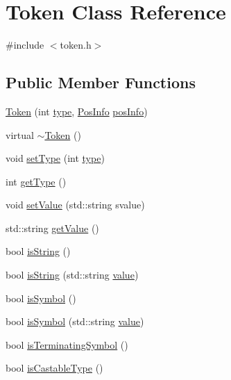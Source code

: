 \hypertarget{classToken}{}\section{Token Class Reference}
\label{classToken}


{\ttfamily \#include $<$token.\+h$>$}

\subsection*{Public Member Functions}
\begin{DoxyCompactItemize}
\item 
\hyperlink{classToken_afe885acc6bfe5ca1d37e3879764a7e20}{Token} (int \hyperlink{classToken_ae46b6b806df89709a13a14dc76c86623}{type}, \hyperlink{classPosInfo}{Pos\+Info} \hyperlink{classToken_a1eea7460906ca57268f808f011af34e6}{pos\+Info})
\item 
virtual \hyperlink{classToken_a40b86b9fc63219310f29413cd89d505a}{$\sim$\+Token} ()
\item 
void \hyperlink{classToken_a6bf54cdc17cec9c64eeefaf756c260d6}{set\+Type} (int \hyperlink{classToken_ae46b6b806df89709a13a14dc76c86623}{type})
\item 
int \hyperlink{classToken_a34e68f22453e7d1d41097ab76ddc199a}{get\+Type} ()
\item 
void \hyperlink{classToken_a0c3a53668483200013e6a2c296fb15c1}{set\+Value} (std\+::string svalue)
\item 
std\+::string \hyperlink{classToken_aeb9ee4b4573bbaab6b33aed601987ff2}{get\+Value} ()
\item 
bool \hyperlink{classToken_aa0b7e4fc76b48f23b0b9cd5daf357f7b}{is\+String} ()
\item 
bool \hyperlink{classToken_a1122d667eaa5a1ae5d5a3b25311693e4}{is\+String} (std\+::string \hyperlink{classToken_a4b7142147b8598f8e24c404928d9263b}{value})
\item 
bool \hyperlink{classToken_a761ab5150b5ecaac78369f25cda2617c}{is\+Symbol} ()
\item 
bool \hyperlink{classToken_ad6a3e5b7a9c56770315cd1c212e634b4}{is\+Symbol} (std\+::string \hyperlink{classToken_a4b7142147b8598f8e24c404928d9263b}{value})
\item 
bool \hyperlink{classToken_ad8fb4783c6e26a402f5d688a0c33075b}{is\+Terminating\+Symbol} ()
\item 
bool \hyperlink{classToken_a12323f98c2de851b0194e7113c28e739}{is\+Castable\+Type} ()
\item 

\end{DoxyCompactItemize}
